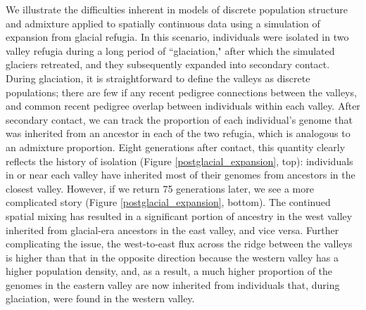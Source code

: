 \documentclass{ar-1col}
\begin{document}
We illustrate the difficulties inherent in 
models of discrete population structure and admixture applied to spatially continuous data 
using a simulation of expansion from glacial refugia.
In this scenario, 
individuals were isolated in two valley refugia during a long period of ``glaciation,"
after which the simulated glaciers retreated, 
and they subsequently expanded into secondary contact.
During glaciation, 
it is straightforward to define the valleys as discrete populations;
there are few if any recent pedigree connections between the valleys, 
and common recent pedigree overlap between individuals within each valley.
After secondary contact, 
we can track the proportion of each individual's genome that 
was inherited from an ancestor in each of the two refugia, 
which is analogous to an admixture proportion.
Eight generations after contact, 
this quantity clearly reflects the history of isolation 
(Figure \ref{postglacial_expansion}, top): 
individuals in or near each valley have inherited most of their genomes 
from ancestors in the closest valley.
However, if we return 75 generations later, 
we see a more complicated story (Figure \ref{postglacial_expansion}, bottom). 
The continued spatial mixing has resulted in a significant 
portion of ancestry in the west valley inherited from 
glacial-era ancestors in the east valley, 
and vice versa.
Further complicating the issue, 
the west-to-east flux across the ridge between the valleys 
is higher than that in the opposite direction 
because the western valley has a higher population density, 
and, as a result, a much higher proportion of the genomes
in the eastern valley are now inherited 
from individuals that, 
during glaciation, were found in the western valley.
\end{document}
